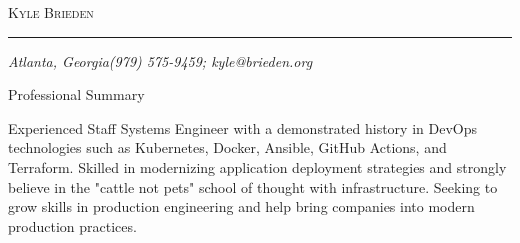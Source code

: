 \documentclass[10pt,oneside]{article}
\makeatletter
\newcommand{\name}{Kyle Brieden}
\newcommand{\addr}{Atlanta, Georgia}
\newcommand{\phone}{(979) 575-9459}
\newcommand{\email}{kyle@brieden.org}
\newcommand{\bigname}[1]{
    \begin{center}\fontfamily{phv}\selectfont\Huge\scshape#1\end{center}
}
\newenvironment{ressection}[1]{
    \vspace{4pt}
    {\fontfamily{phv}\selectfont\Large#1}
    \begin{itemize}
    \vspace{3pt}
}{
    \end{itemize}
}
\makeatother
\begin{document}
 \selectfont

\bigname{\name}

\vspace{-8pt} \rule{\textwidth}{1pt}

\vspace{-1pt} {\small\itshape \addr \hfill \phone; \email}

\vspace{8 pt}

\begin{ressection}{Professional Summary}

    \begin{resobj}{Experienced Staff Systems Engineer with a demonstrated history in DevOps technologies such as Kubernetes, Docker, Ansible, GitHub Actions, and Terraform.  Skilled in modernizing application deployment strategies and strongly believe in the "cattle not pets" school of thought with infrastructure.  Seeking to grow skills in production engineering and help bring companies into modern production practices.}
   \end{resobj}

\end{ressection}
\end{document}
